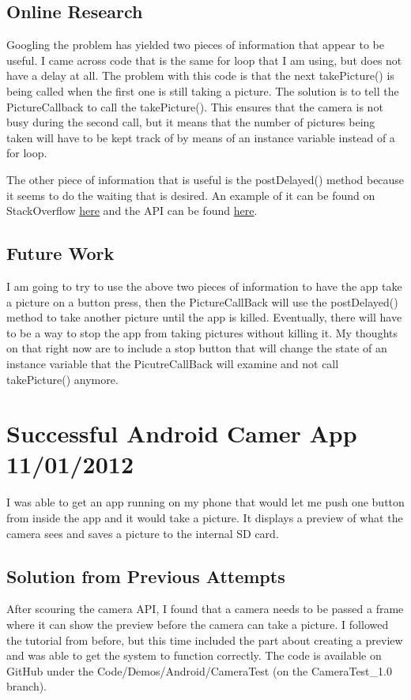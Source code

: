 \documentclass[]{article}
\begin{document}
		\subsection{Online Research}
			Googling the problem has yielded two pieces of information that appear to be useful. I came across code that is the same for loop that I am using, but does not have a delay at all. The problem with this code is that the next takePicture() is being called when the first one is still taking a picture. The solution is to tell the PictureCallback to call the takePicture(). This ensures that the camera is not busy during the second call, but it means that the number of pictures being taken will have to be kept track of by means of an instance variable instead of a for loop. 
			
			The other piece of information that is useful is the postDelayed() method because it seems to do the waiting that is desired. An example of it can be found on StackOverflow \href{http://stackoverflow.com/questions/4111905/how-do-you-have-the-code-pause-for-a-couple-of-seconds-in-android}{here} and the API can be found \href{http://developer.android.com/reference/android/os/Handler.html#postDelayed\%28java.lang.Runnable,\%20long\%29}{here}.
			
		\subsection{Future Work}
			I am going to try to use the above two pieces of information to have the app take a picture on a button press, then the PictureCallBack will use the postDelayed() method to take another picture until the app is killed. Eventually, there will have to be a way to stop the app from taking pictures without killing it. My thoughts on that right now are to include a stop button that will change the state of an instance variable that the PicutreCallBack will examine and not call takePicture() anymore.
		
	
	\section{Successful Android Camer App 11/01/2012}
		I was able to get an app running on my phone that would let me push one button from inside the app and it would take a picture. It displays a preview of what the camera sees and saves a picture to the internal SD card. 
		
		\subsection{Solution from Previous Attempts}
			After scouring the camera API, I found that a camera needs to be passed a frame where it can show the preview before the camera can take a picture. I followed the tutorial from before, but this time included the part about creating a preview and was able to get the system to function correctly. The code is available on  GitHub under the Code/Demos/Android/CameraTest (on the CameraTest\_1.0 branch). 
			
\end{document}

